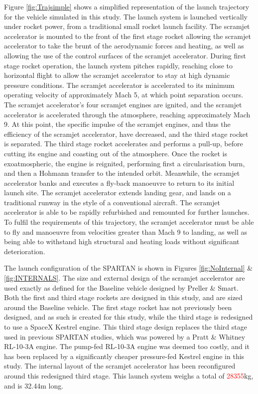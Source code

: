  Figure \ref{fig:Trajsimple} shows a simplified representation of the launch trajectory for the vehicle simulated in this study.
 The launch system is launched vertically under rocket power, from a traditional small rocket launch facility. The scramjet accelerator is mounted to the front of the first stage rocket allowing the scramjet accelerator to take the brunt of the aerodynamic forces and heating, as well as allowing the use of the control surfaces of the scramjet accelerator. During first stage rocket operation, the launch system pitches rapidly, reaching close to horizontal flight to allow the scramjet accelerator to stay at high dynamic pressure conditions. The scramjet accelerator is accelerated to its minimum operating velocity of approximately Mach 5, at which point separation occurs. The scramjet accelerator's four scramjet engines are ignited, and the scramjet accelerator is accelerated through the atmosphere, reaching approximately Mach 9. At this point, the specific impulse of the scramjet engines, and thus the efficiency of the scramjet accelerator, have decreased, and the third stage rocket is separated. The third stage rocket accelerates and performs a pull-up, before cutting its engine and coasting out of the atmosphere. Once the rocket is exoatmospheric, the engine is reignited, performing first a circularisation burn, and then a Hohmann transfer to the intended orbit. Meanwhile, the scramjet accelerator banks and executes a fly-back manoeuvre to return to its initial launch site. The scramjet accelerator extends landing gear, and lands on a traditional runway in the style of a conventional aircraft. The scramjet accelerator is able to be rapidly refurbished and remounted for further launches. To fulfil the requirements of this trajectory, the scramjet accelerator must be able to fly and manoeuvre from velocities greater than Mach 9 to landing, as well as being able to withstand high structural and heating loads without significant deterioration.
 
 The launch configuration of the SPARTAN is shown in Figures \ref{fig:NoInternal} \& \ref{fig:INTERNALS}. 
 The size and external design of the scramjet accelerator are used exactly as defined for the Baseline vehicle designed by Preller \& Smart\cite{Preller2017b}. Both the first and third stage rockets are designed in this study, and are sized around the Baseline vehicle. 
 The first stage rocket has not previously been designed, and as such is created for this study, while the third stage is redesigned to use a SpaceX Kestrel engine. This third stage design replaces the third stage used in previous SPARTAN studies, which was powered by a Pratt \& Whitney RL-10-3A engine\cite{Preller2017b}. The pump-fed RL-10-3A engine was deemed too costly, and it has been replaced by a significantly cheaper pressure-fed Kestrel engine in this study.  
 The internal layout of the scramjet accelerator has been reconfigured around this redesigned third stage. 
 This launch system weighs a total of \textcolor{red}{28355}kg, and is 32.44m long. 
 
